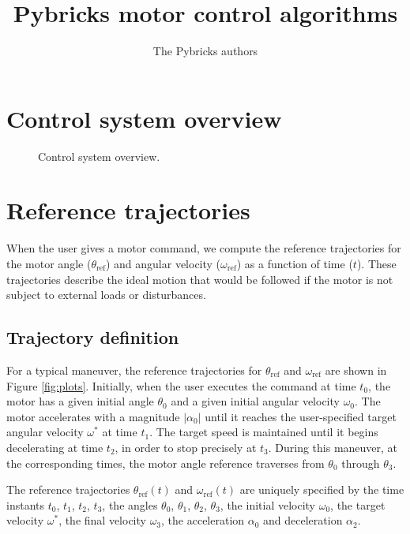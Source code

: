 \documentclass[12pt, a4paper]
{article}
\title{Pybricks motor control algorithms}
\author{The Pybricks authors}
\providecommand{\sub}[1]{_{\text{#1}}}
\providecommand{\w}{\omega}
\providecommand{\wt}{\w^*}
\providecommand{\wref}{\w\sub{ref}}
\renewcommand{\th}{\theta}
\providecommand{\thref}{\th\sub{ref}}
\renewcommand{\a}{\alpha}
\providecommand{\abs}[1]{\left|#1\right|}
\begin{document}
\maketitle

\tableofcontents
\pagebreak

\section{Control system overview}

\begin{figure}[H]
    \centering
    \fontsize{8}{10}\selectfont
    
    \caption{
        Control system overview.
        \label{fig:controloverview}}
\end{figure}


\section{Reference trajectories}

When the user gives a motor command, we compute the reference trajectories for
the motor angle ($\thref$) and angular velocity ($\wref$) as a function of
time ($t$). These trajectories describe the ideal motion that would be followed
if the motor is not subject to external loads or disturbances.

\subsection{Trajectory definition}

For a typical maneuver, the reference trajectories for $\thref$ and $\wref$
are shown in Figure \ref{fig:plots}. Initially, when the user executes the
command at time $t_0$, the motor has a given initial angle $\th_0$ and a given
initial angular velocity $\w_0$. The motor accelerates with a magnitude
$\abs{\a_0}$ until it reaches the user-specified target angular velocity $\wt$
at time $t_1$. The target speed is maintained until it begins decelerating at
time $t_2$, in order to stop precisely at $t_3$. During this maneuver, at the
corresponding times, the motor angle reference traverses from $\th_0$ through
$\th_3$.

The reference trajectories $\thref(t)$ and $\wref(t)$ are uniquely specified by
the time instants $t_0$, $t_1$, $t_2$, $t_3$, the angles $\th_0$, $\th_1$,
$\th_2$, $\th_3$, the initial velocity $\w_0$, the target velocity $\wt$, the
final velocity $\w_3$, the acceleration $\a_0$ and deceleration $\a_2$.
\end{document}

